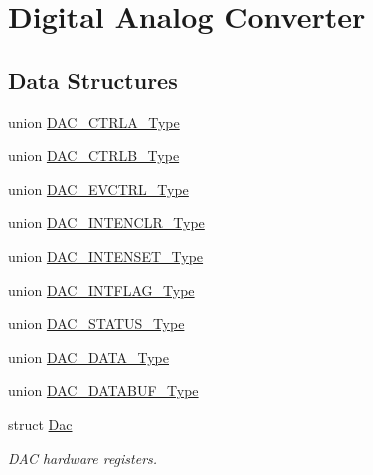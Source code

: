 \hypertarget{group___s_a_m_d21___d_a_c}{}\section{Digital Analog Converter}
\label{group___s_a_m_d21___d_a_c}
\subsection*{Data Structures}
\begin{DoxyCompactItemize}
\item 
union \mbox{\hyperlink{union_d_a_c___c_t_r_l_a___type}{D\+A\+C\+\_\+\+C\+T\+R\+L\+A\+\_\+\+Type}}
\item 
union \mbox{\hyperlink{union_d_a_c___c_t_r_l_b___type}{D\+A\+C\+\_\+\+C\+T\+R\+L\+B\+\_\+\+Type}}
\item 
union \mbox{\hyperlink{union_d_a_c___e_v_c_t_r_l___type}{D\+A\+C\+\_\+\+E\+V\+C\+T\+R\+L\+\_\+\+Type}}
\item 
union \mbox{\hyperlink{union_d_a_c___i_n_t_e_n_c_l_r___type}{D\+A\+C\+\_\+\+I\+N\+T\+E\+N\+C\+L\+R\+\_\+\+Type}}
\item 
union \mbox{\hyperlink{union_d_a_c___i_n_t_e_n_s_e_t___type}{D\+A\+C\+\_\+\+I\+N\+T\+E\+N\+S\+E\+T\+\_\+\+Type}}
\item 
union \mbox{\hyperlink{union_d_a_c___i_n_t_f_l_a_g___type}{D\+A\+C\+\_\+\+I\+N\+T\+F\+L\+A\+G\+\_\+\+Type}}
\item 
union \mbox{\hyperlink{union_d_a_c___s_t_a_t_u_s___type}{D\+A\+C\+\_\+\+S\+T\+A\+T\+U\+S\+\_\+\+Type}}
\item 
union \mbox{\hyperlink{union_d_a_c___d_a_t_a___type}{D\+A\+C\+\_\+\+D\+A\+T\+A\+\_\+\+Type}}
\item 
union \mbox{\hyperlink{union_d_a_c___d_a_t_a_b_u_f___type}{D\+A\+C\+\_\+\+D\+A\+T\+A\+B\+U\+F\+\_\+\+Type}}
\item 
struct \mbox{\hyperlink{struct_dac}{Dac}}
\begin{DoxyCompactList}\small\item\em D\+AC hardware registers. \end{DoxyCompactList}\end{DoxyCompactItemize}
